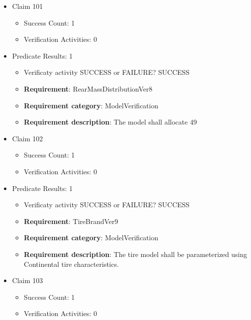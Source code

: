 \documentclass{article}
\begin{document}
\begin{itemize}
  				  \item Claim 101
				\begin{itemize}
			    	\item Success Count: 1 
			    	\item Verification Activities: 0
				\end{itemize}
				
									    
				\item Predicate Results: 1
					\begin{itemize}				
					\item Verificaty activity SUCCESS or FAILURE? SUCCESS
					
					\item \textbf{Requirement}: RearMassDistributionVer8 
					\item \textbf{Requirement category}: ModelVerification
					\item \textbf{Requirement description}: The model shall allocate 49%
					\end{itemize}

  				  \item Claim 102
				\begin{itemize}
			    	\item Success Count: 1 
			    	\item Verification Activities: 0
				\end{itemize}
				
									    
				\item Predicate Results: 1
					\begin{itemize}				
					\item Verificaty activity SUCCESS or FAILURE? SUCCESS
					
					\item \textbf{Requirement}: TireBrandVer9 
					\item \textbf{Requirement category}: ModelVerification
					\item \textbf{Requirement description}: The tire model shall be parameterized using Continental tire characteristics.
					\end{itemize}

  				  \item Claim 103
				\begin{itemize}
			    	\item Success Count: 1 
			    	\item Verification Activities: 0
				\end{itemize}
				

\end{itemize}
\end{document}
